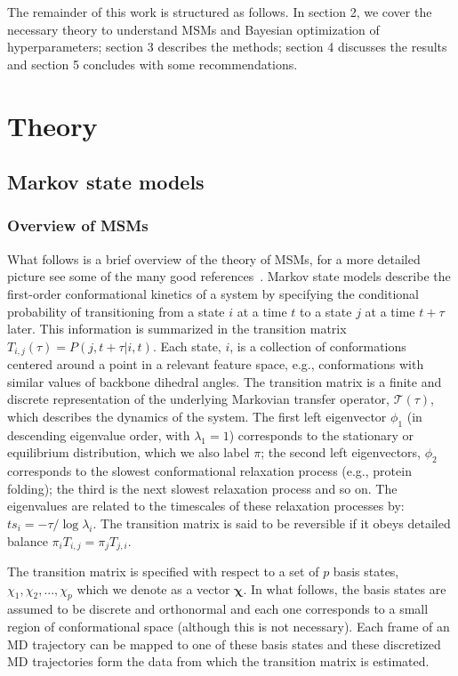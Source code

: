 \documentclass[journal=jacsat,manuscript=article]{achemso}
\begin{document}
The remainder of this work is structured as follows.  In section 2, we cover the necessary theory to understand MSMs and Bayesian optimization of hyperparameters; section 3 describes the methods; section 4 discusses the results and section 5 concludes with some recommendations. 

\section{Theory}\label{theory}
\subsection{Markov state models}
\subsubsection{Overview of MSMs}

What follows is a brief overview of the theory of MSMs, for a more detailed picture see some of the many good references~\cite{prinzMarkovModelsMolecular2011, trendelkamp-schroer_estimation_2015,husic_markov_2018}. Markov state models describe the first-order conformational kinetics of a system by specifying the conditional probability of transitioning from a state $i$ at a time $t$ to a state $j$ at a time $t+\tau$  later. This information is summarized in the transition matrix $T_{i, j}(\tau) = P(j, t+\tau | i, t)$. Each state, $i$, is a collection of conformations centered around a point in a relevant feature space, e.g., conformations with similar values of backbone dihedral angles. The transition matrix is a finite and discrete representation of the underlying Markovian transfer operator, $\mathcal{T}(\tau)$, which describes the dynamics of the system. The first left eigenvector $\phi_1$ (in descending eigenvalue order, with $\lambda_{1} = 1$) corresponds to the stationary or equilibrium distribution, which we also label $\pi$; the second left eigenvectors, $\phi_2$ corresponds to the slowest conformational relaxation process (e.g., protein folding); the third is the next slowest relaxation process and so on. The eigenvalues are related to the timescales of these relaxation processes by: $ts_{i} = -\tau/\log{\lambda_i}$.  The transition matrix is said to be reversible if it obeys detailed balance $\pi_i T_{i, j}=\pi_j T_{j, i}$. 

The transition matrix is specified with respect to a set of $p$ basis states, $\chi_1, \chi_2, ..., \chi_p$ which we denote as a vector $\bm{\chi}$. In what follows, the basis states are assumed to be discrete and orthonormal and each one corresponds to a small region of conformational space (although this is not necessary).  Each frame of an MD trajectory can be mapped to one of these basis states and these discretized MD trajectories form the data from which the transition matrix is estimated.
\end{document}
